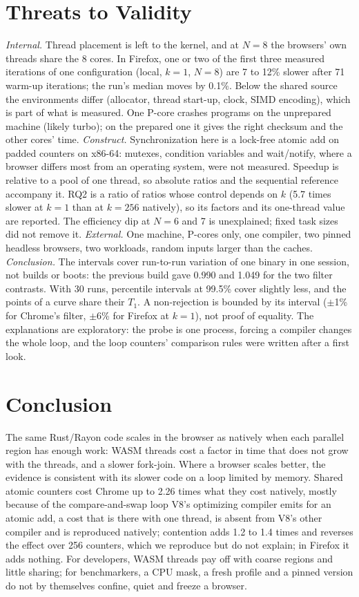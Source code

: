 \documentclass[sigplan]{acmart}
\begin{document}
\section{Threats to Validity}

\emph{Internal.} Thread placement is left to the kernel, and at $N=8$
the browsers' own threads share the 8 cores. In
Firefox, one or two of the first three measured iterations of one
configuration (local, $k=1$, $N=8$) are 7 to 12\% slower after 71 warm-up
iterations; the run's median moves by 0.1\%. Below the shared source the
environments differ (allocator, thread start-up, clock, SIMD encoding),
which is part of what is measured. One P-core crashes programs on the
unprepared machine (likely turbo); on the prepared one it gives the right
checksum and the other cores' time.
\emph{Construct.} Synchronization here is a lock-free atomic add on padded
counters on x86-64: mutexes, condition variables and wait/notify, where a
browser differs most from an operating system, were not measured. Speedup
is relative to a pool of one thread, so absolute ratios and the sequential
reference accompany it. RQ2 is a ratio of ratios whose control depends on
$k$ (5.7 times slower at $k=1$ than at $k=256$ natively), so its factors
and its one-thread value are reported. The efficiency dip at $N=6$ and 7 is
unexplained; fixed task sizes did not remove it. \emph{External.} One
machine, P-cores only, one compiler, two pinned headless browsers, two
workloads, random inputs larger than the caches. \emph{Conclusion.}
The intervals cover run-to-run variation of one binary in one session, not
builds or boots: the previous build gave 0.990 and 1.049 for the two filter
contrasts. With 30 runs, percentile intervals at 99.5\% cover slightly
less, and the points of a curve share their $T_1$. A non-rejection is
bounded by its interval ($\pm$1\% for Chrome's filter, $\pm$6\% for
Firefox at $k=1$), not proof of equality. The explanations are exploratory:
the probe is one process, forcing a compiler changes the whole loop, and
the loop counters' comparison rules were written after a first look.

\section{Conclusion}

The same Rust/Rayon code scales in the browser as natively when each
parallel region has enough work: WASM threads cost a factor in time that
does not grow with the threads, and a slower fork-join. Where a browser
scales better, the evidence is consistent with its slower code on a loop
limited by memory. Shared atomic counters cost Chrome up to 2.26 times what
they cost natively, mostly because of the compare-and-swap loop V8's
optimizing compiler emits for an atomic add, a cost that is there with one
thread, is absent from V8's other compiler and is reproduced natively;
contention adds 1.2 to 1.4 times and reverses the effect over 256 counters,
which we reproduce but do not explain; in Firefox it adds nothing.
For developers, WASM threads pay off with coarse regions and little
sharing; for benchmarkers, a CPU mask, a fresh profile and a pinned version
do not by themselves confine, quiet and freeze a browser.
\end{document}
